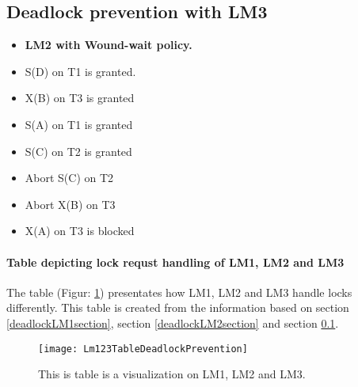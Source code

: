 \subsection{Deadlock prevention with LM3} \label{deadlockLM3section}

\begin{itemize}
	\item{\textbf{LM2 with Wound-wait policy.}}
	\item S(D) on T1 is granted.
	\item X(B) on T3 is granted
	\item S(A) on T1 is granted
	\item S(C) on T2 is granted
	\item Abort S(C) on T2
	\item Abort X(B) on T3
	\item X(A) on T3 is blocked
\end{itemize}
\pagebreak
\paragraph{Table depicting lock requst handling of LM1, LM2 and LM3}
The table (Figur: \ref{fig:Lm123TableDeadlockPrevention}) presentates how LM1, LM2 and LM3 handle locks differently. This table is created from the information based on section \ref{deadlockLM1section}, section \ref{deadlockLM2section} and section \ref{deadlockLM3section}.
\begin{figure}[H]
\centering
\texttt{[image: Lm123TableDeadlockPrevention]}
\caption{This is table is a visualization on LM1, LM2 and LM3.}
\label{fig:Lm123TableDeadlockPrevention}
\end{figure}
